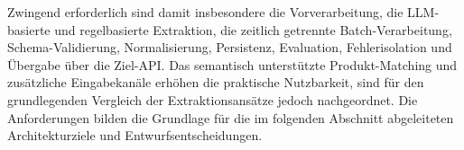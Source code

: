 Zwingend erforderlich sind damit insbesondere die Vorverarbeitung, die LLM-basierte und regelbasierte Extraktion, die zeitlich getrennte Batch-Verarbeitung, Schema-Validierung, 
Normalisierung, Persistenz, Evaluation, Fehlerisolation und Übergabe über die Ziel-API. Das semantisch unterstützte Produkt-Matching und zusätzliche Eingabekanäle erhöhen die 
praktische Nutzbarkeit, sind für den grundlegenden Vergleich der Extraktionsansätze jedoch nachgeordnet. Die Anforderungen bilden die Grundlage für die im folgenden Abschnitt 
abgeleiteten Architekturziele und Entwurfsentscheidungen.